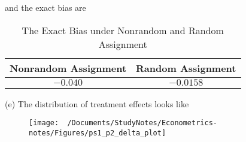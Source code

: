\documentclass[11pt,a4paper]{amsart}
\theoremstyle{plain}
\theoremstyle{definition}
\begin{document}
and the exact bias are 
\begin{table}[hbt]
\caption{\label{tb:p2_exact_bias} The Exact Bias under Nonrandom and Random Assignment}
{
	\def\sym#1{\ifmmode^{#1}\else\(^{#1}\)\fi}
	\begin{tabular}{||c|c||}
		\hline
		Nonrandom Assignment & Random Assignment \\
		\hline
		$-0.040$ & $-0.0158$ \\
		\hline
\end{tabular} }
\end{table}

(e) The distribution of treatment effects looks like 
\begin{figure}[hbt]
	{\centering \texttt{[image: ~/Documents/StudyNotes/Econometrics-notes/Figures/ps1\_p2\_delta\_plot]}}
	\label{F:p2_delta}
\end{figure}
\end{document}
